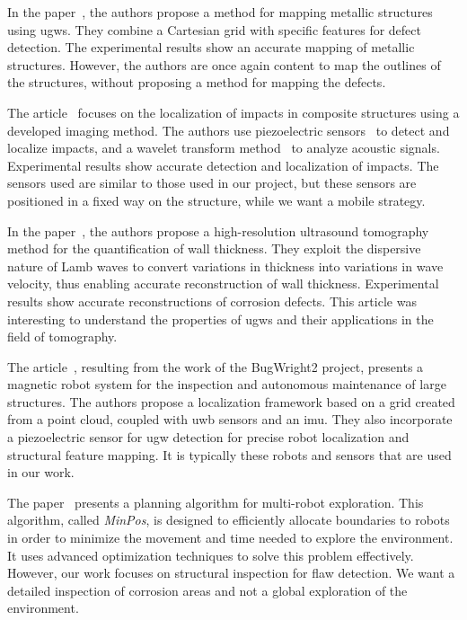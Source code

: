 In the paper~\cite{9811581}, the authors propose a method for mapping metallic structures using \gls{ugw}s.
They combine a Cartesian grid with specific features for defect detection.
The experimental results show an accurate mapping of metallic structures.
However, the authors are once again content to map the outlines of the structures, without proposing a method for mapping the defects.

The article~\cite{inventions3030059} focuses on the localization of impacts in composite structures using a developed imaging method.
The authors use piezoelectric sensors~\cite{enwiki:1154129092} to detect and localize impacts, and a wavelet transform method~\cite{enwiki:1147185762} to analyze acoustic signals.
Experimental results show accurate detection and localization of impacts.
The sensors used are similar to those used in our project, but these sensors are positioned in a fixed way on the structure, while we want a mobile strategy.

In the paper~\cite{HUTHWAITE2013979}, the authors propose a high-resolution ultrasound tomography method for the quantification of wall thickness.
They exploit the dispersive nature of Lamb waves to convert variations in thickness into variations in wave velocity, thus enabling accurate reconstruction of wall thickness.
Experimental results show accurate reconstructions of corrosion defects.
This article was interesting to understand the properties of \gls{ugw}s and their applications in the field of tomography.

The article~\cite{s22093235}, resulting from the work of the BugWright2 project, presents a magnetic robot system for the inspection and autonomous maintenance of large structures.
The authors propose a localization framework based on a grid created from a point cloud, coupled with \gls{uwb} sensors and an \gls{imu}.
They also incorporate a piezoelectric sensor for \gls{ugw} detection for precise robot localization and structural feature mapping.
It is typically these robots and sensors that are used in our work.

The paper~\cite{bautin:hal-00757960} presents a planning algorithm for multi-robot exploration.
This algorithm, called \textit{MinPos}, is designed to efficiently allocate boundaries to robots in order to minimize the movement and time needed to explore the environment. It uses advanced optimization techniques to solve this problem effectively.
However, our work focuses on structural inspection for flaw detection.
We want a detailed inspection of corrosion areas and not a global exploration of the environment.

